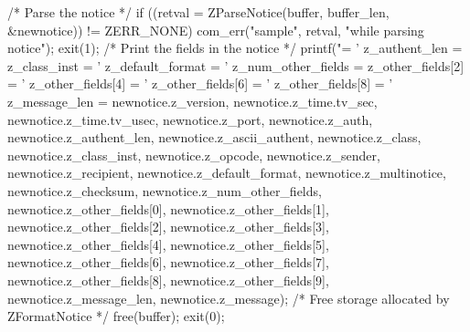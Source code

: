 \begin{code}
{    /* Parse the notice */
    if ((retval = ZParseNotice(buffer, buffer_len, &newnotice)) != ZERR_NONE) {
        com_err("sample", retval, "while parsing notice");
        exit(1);
    }
    /* Print the fields in the notice */
    printf("\nversion = '%
z_authent_len = %
z_class_inst = '%
z_default_format = '%
z_num_other_fields = %
z_other_fields[2] = '%
z_other_fields[4] = '%
z_other_fields[6] = '%
z_other_fields[8] = '%
z_message_len = %
           newnotice.z_version,
           newnotice.z_time.tv_sec, newnotice.z_time.tv_usec,
           newnotice.z_port,
           newnotice.z_auth,
           newnotice.z_authent_len,
           newnotice.z_ascii_authent,
           newnotice.z_class,
           newnotice.z_class_inst,
           newnotice.z_opcode,
           newnotice.z_sender,
           newnotice.z_recipient,
           newnotice.z_default_format,
           newnotice.z_multinotice,
           newnotice.z_checksum,
           newnotice.z_num_other_fields,
           newnotice.z_other_fields[0],
           newnotice.z_other_fields[1],
           newnotice.z_other_fields[2],
           newnotice.z_other_fields[3],
           newnotice.z_other_fields[4],
           newnotice.z_other_fields[5],
           newnotice.z_other_fields[6],
           newnotice.z_other_fields[7],
           newnotice.z_other_fields[8],
           newnotice.z_other_fields[9],
           newnotice.z_message_len,
           newnotice.z_message);
    /* Free storage allocated by ZFormatNotice */
    free(buffer);
    exit(0);
}
\end{code}
